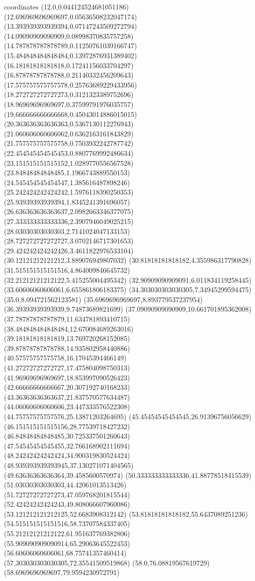 coordinates {%
(12.0,0.044124524681051186)
(12.696969696969697,0.05636508232047174)
(13.393939393939394,0.07147243509272794)
(14.09090909090909,0.08998370835757258)
(14.787878787878789,0.11250761039166747)
(15.484848484848484,0.13972876931389402)
(16.18181818181818,0.17241156033704297)
(16.87878787878788,0.21140332456209643)
(17.575757575757578,0.25763689229433956)
(18.272727272727273,0.3121323389752696)
(18.96969696969697,0.37599791976035757)
(19.666666666666668,0.45043014886015015)
(20.363636363636363,0.5367130112276943)
(21.060606060606062,0.6362163161843829)
(21.757575757575758,0.7503932242787742)
(22.454545454545453,0.8807769992486634)
(23.151515151515152,1.0289770556567528)
(23.84848484848485,1.1966743889550153)
(24.545454545454547,1.385616487898246)
(25.242424242424242,1.5976118390250353)
(25.93939393939394,1.8345241391696057)
(26.636363636363637,2.0982663346377075)
(27.333333333333336,2.3907946049025215)
(28.03030303030303,2.7141024047133153)
(28.727272727272727,3.0702146717301653)
(29.424242424242426,3.4611822976533104)
(30.12121212121212,3.889076949807032)
(30.81818181818182,4.355986317790828)
(31.515151515151516,4.864009846645732)
(32.21212121212122,5.415255004495342)
(32.90909090909091,6.011834119258445)
(33.60606060606061,6.655861806183375)
(34.303030303030305,7.34945299594475)
(35.0,8.094721562123581)
(35.6969696969697,8.893779537237954)
(36.39393939393939,9.74873689821699)
(37.09090909090909,10.661701895362008)
(37.78787878787879,11.634781893410715)
(38.484848484848484,12.670084689263016)
(39.18181818181819,13.769720268152085)
(39.87878787878788,14.935802958440886)
(40.57575757575758,16.17045394466149)
(41.27272727272727,17.475804098750313)
(41.96969696969697,18.853997090526423)
(42.66666666666667,20.307192740168233)
(43.36363636363637,21.837570577634487)
(44.06060606060606,23.447333576522308)
(44.75757575757576,25.13871203264695)
(45.45454545454545,26.91396756056629)
(46.151515151515156,28.77539718427232)
(46.84848484848485,30.725337501260643)
(47.54545454545455,32.766168902111694)
(48.24242424242424,34.900319830524424)
(48.939393939393945,37.130271071404565)
(49.63636363636364,39.4585600570974)
(50.333333333333336,41.88778518415539)
(51.03030303030303,44.42061013513426)
(51.72727272727273,47.059768201815544)
(52.42424242424243,49.808066607960086)
(53.121212121212125,52.6683908312142)
(53.81818181818182,55.6437089251236)
(54.515151515151516,58.73707584337405)
(55.21212121212122,61.951637769382806)
(55.909090909090914,65.29063645522453)
(56.60606060606061,68.75741357460414)
(57.303030303030305,72.35541509519868)
(58.0,76.08819567619729)
(58.6969696969697,79.9594230972791)
}

